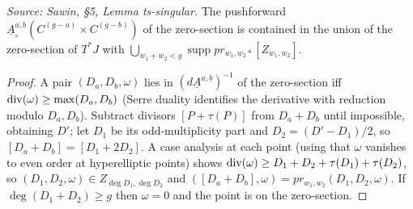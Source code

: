 \begin{lemma}
  \label{lem:sawin_ts_singular}
  \textit{Source: Sawin, §5, Lemma ts-singular.}
  The pushforward $\underline A^{a,b}_\circ(C^{(g-a)}\times C^{(g-b)})$ of the
  zero-section is contained in the union of the zero-section of $T^*J$ with
  $\bigcup_{w_1+w_2<g}\operatorname{supp} pr_{w_1,w_2*}[Z_{w_1,w_2}]$.
\end{lemma}
\begin{proof}
  A pair $(D_a,D_b,\omega)$ lies in $(d\underline A^{a,b})^{-1}$ of the
  zero-section iff $\operatorname{div}(\omega)\ge\max(D_a,D_b)$ (Serre duality identifies the
  derivative with reduction modulo $D_a,D_b$).  Subtract divisors $[P+\tau(P)]$
  from $D_a+D_b$ until impossible, obtaining $D'$; let $D_1$ be its odd-multiplicity
  part and $D_2=(D'-D_1)/2$, so $[D_a+D_b]=[D_1+2D_2]$.  A case analysis at each
  point (using that $\omega$ vanishes to even order at hyperelliptic points) shows
  $\operatorname{div}(\omega)\ge D_1+D_2+\tau(D_1)+\tau(D_2)$, so $(D_1,D_2,\omega)\in
  Z_{\deg D_1,\deg D_2}$ and $([D_a+D_b],\omega)=pr_{w_1,w_2}(D_1,D_2,\omega)$.  If
  $\deg(D_1+D_2)\ge g$ then $\omega=0$ and the point is on the zero-section.
\end{proof}

